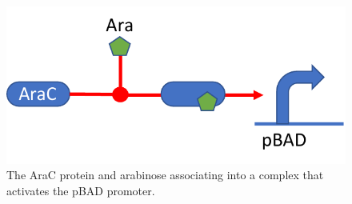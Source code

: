 {\begin{figure}[h!]
\includegraphics[scale=0.75]{figures/apdx-examples/apdx-exa22.pdf}
\caption{The AraC protein and arabinose associating into a complex that activates the pBAD promoter.}
\label{f:apdx:exa22}
\end{figure}

}



